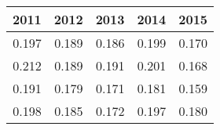 \begin{tabular}{rrrrr}
\toprule
2011 & 2012 & 2013 & 2014 & 2015 \\
\midrule
0.197 & 0.189 & 0.186 & 0.199 & 0.170 \\
0.212 & 0.189 & 0.191 & 0.201 & 0.168 \\
0.191 & 0.179 & 0.171 & 0.181 & 0.159 \\
0.198 & 0.185 & 0.172 & 0.197 & 0.180 \\
\bottomrule
\end{tabular}
